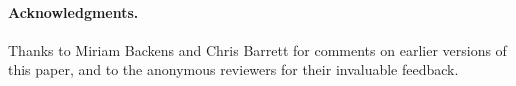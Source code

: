 \documentclass{lmcs}
\begin{document}
\paragraph*{Acknowledgments.}
Thanks to Miriam Backens and Chris Barrett for comments on earlier versions of
this paper, and to the anonymous reviewers for their invaluable feedback.



\end{document}

